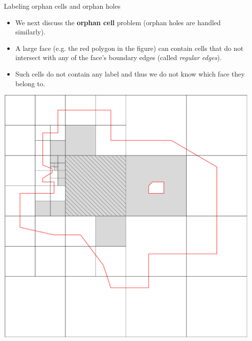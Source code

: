     \begin{frame}{Labeling orphan cells and orphan holes}
        \begin{minipage}{0.59\textwidth}
            \begin{itemize}
                \item We next discuss the \textbf{orphan cell} problem (orphan holes are handled similarly).
                \item A large face (e.g. the red polygon in the figure) can contain cells that do not intersect with any of the face's boundary edges (called \textit{regular edges}).
                \item Such cells do not contain any label and thus we do not know which face they belong to.
            \end{itemize}
        \end{minipage}\hfill %
        \begin{minipage}{0.4\textwidth}
            \centering
            \includegraphics[width=\textwidth]{../thesis/chapterSDCEL/orphan_cells/emptycells}
            \end{minipage}
    \end{frame}

